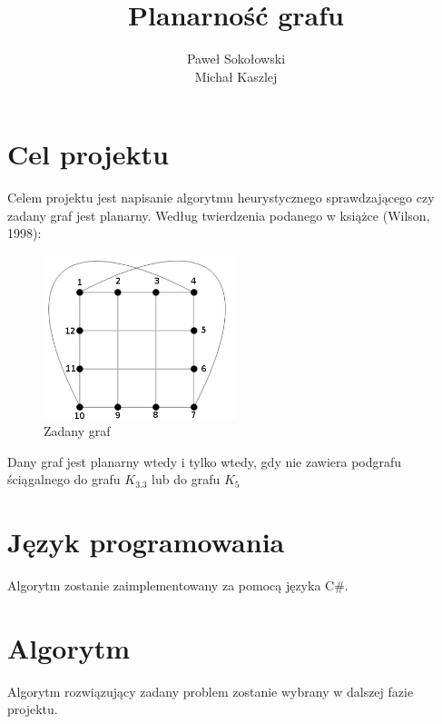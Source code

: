 \documentclass[a4 122pt]{article}
\title{Planarność grafu}
\author{Paweł Sokołowski\\Michał Kaszlej}
\begin{document}
\maketitle

	\section{Cel projektu}

		Celem projektu jest napisanie algorytmu heurystycznego sprawdzającego czy zadany graf jest planarny.
		Według twierdzenia podanego w książce (Wilson, 1998):

		\begin{figure}[h]
			\begin{center}
				\includegraphics[width=0.5\textwidth]{include/graf.png}
				\caption{Zadany graf}
			\end{center}
		\end{figure}


		Dany graf jest planarny wtedy i tylko wtedy, gdy nie zawiera podgrafu ściągalnego do grafu $K_{3.3}$ lub do grafu $ K_5 $

	\section{Język programowania} 

		Algorytm zostanie zaimplementowany za pomocą języka C\#.

	\section{Algorytm}

		Algorytm rozwiązujący zadany problem zostanie wybrany w dalszej fazie projektu.

	\pagebreak
\end{document}
